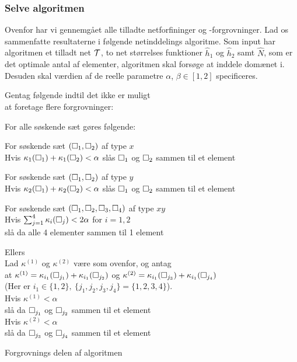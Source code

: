 \subsubsection{Selve algoritmen}
Ovenfor har vi gennemgået alle tilladte netforfininger og
-forgrovninger. Lad os sammenfatte resultaterne i følgende
netinddelings algoritme. Som input har algoritmen et tilladt net $\mathcal T$,
to net størrelses funktioner $\hat{h}_1$ og $\hat{h}_2$ samt
$\hat{N}$, som er det optimale antal af elementer, algoritmen skal
forsøge at inddele domænet i. Desuden skal værdien af de reelle
parametre $\alpha$, $\beta\in[1,2]$ specificeres.
\begin{Algoritme}[H]
\begin{emptylist}
\setlength{\itemsep}{0cm}
\setlength{\parsep}{0cm}
  \item Gentag følgende indtil det ikke er muligt \\ 
        \makebox[.25in][r]{} at foretage flere forgrovninger:
  \item For alle søskende sæt gøres følgende:   
  \item For søskende sæt $(\Box_1,\Box_2)$ af type $x$ \\
        \makebox[.25in][r]{} Hvis $\kappa_1(\Box_1)+\kappa_1(\Box_2)<\alpha$
        slås $\Box_1$ og $\Box_2$ sammen til et element
  \item For søskende sæt $(\Box_1,\Box_2)$ af type $y$ \\
        \makebox[.25in][r]{} Hvis $\kappa_2(\Box_1)+\kappa_2(\Box_2)<\alpha$   
        slås $\Box_1$ og $\Box_2$ sammen til et element
  \item For søskende sæt $(\Box_1,\Box_2,\Box_3,\Box_4)$ af type $xy$ \\
        \makebox[.25in][r]{} Hvis $\sum_{j=1}^4 \kappa_i(\Box_j)<2\alpha$
        for $i=1,2$ \\
        \makebox[.5in][r]{} slå da alle 4 elementer sammen til 1 element
  \item \makebox[.25in][r]{} Ellers \\
        \makebox[.5in][r]{} Lad $\kappa^{(1)}$ og $\kappa^{(2)}$ være
          som ovenfor, og antag \\
        \makebox[.5in][r]{} at $\kappa^{(1)}=\kappa_{i_1}(\Box_{j_1}) + 
          \kappa_{i_1}(\Box_{j_2})$ og $\kappa^{(2)}=\kappa_{i_1}(\Box_{j_3}) + 
          \kappa_{i_1}(\Box_{j_4})$ \\
        \makebox[.5in][r]{} (Her er $i_1\in\{1,2\},\ \{j_1,j_2,j_3,j_4\}=
          \{1,2,3,4\}$). \\
        \makebox[.5in][r]{} Hvis $\kappa^{(1)}<\alpha$ \\
        \makebox[.75in][r]{} slå da $\Box_{j_1}$ og $\Box_{j_2}$ sammen til et element \\ 
        \makebox[.75in][r]{} Hvis $\kappa^{(2)}<\alpha$ \\
        \makebox[1in][r]{} slå da $\Box_{j_3}$ og $\Box_{j_4}$ sammen til et element
\end{emptylist}
\caption{Forgrovnings delen af algoritmen\label{forgrov}}
\end{Algoritme}
